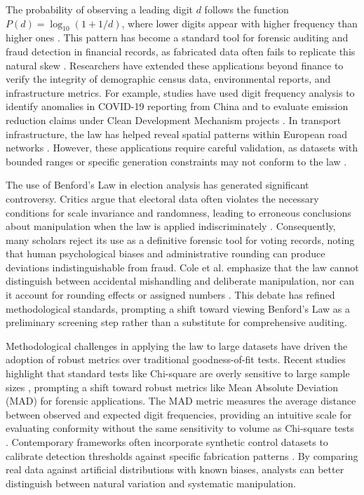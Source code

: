 \documentclass[11pt,a4paper]{article}
\begin{document}
The probability of observing a leading digit $d$ follows the function $P(d) = \log_{10}(1 + 1/d)$, where lower digits appear with higher frequency than higher ones \cite{Hill1998TheFD}. This pattern has become a standard tool for forensic auditing and fraud detection in financial records, as fabricated data often fails to replicate this natural skew \cite{Shalini2023DataQA,Azevedo2021ABL}. Researchers have extended these applications beyond finance to verify the integrity of demographic census data, environmental reports, and infrastructure metrics. For example, studies have used digit frequency analysis to identify anomalies in COVID-19 reporting from China and to evaluate emission reduction claims under Clean Development Mechanism projects \cite{Silva2024ANA,Cole2019TestingTE}. In transport infrastructure, the law has helped reveal spatial patterns within European road networks \cite{Ivanova2025BenfordsLA}. However, these applications require careful validation, as datasets with bounded ranges or specific generation constraints may not conform to the law \cite{Druica2018BenfordsLA}.

The use of Benford's Law in election analysis has generated significant controversy. Critics argue that electoral data often violates the necessary conditions for scale invariance and randomness, leading to erroneous conclusions about manipulation when the law is applied indiscriminately \cite{Kossovsky2021OnTM}. Consequently, many scholars reject its use as a definitive forensic tool for voting records, noting that human psychological biases and administrative rounding can produce deviations indistinguishable from fraud. Cole et al. emphasize that the law cannot distinguish between accidental mishandling and deliberate manipulation, nor can it account for rounding effects or assigned numbers \cite{Cole2019TestingTE}. This debate has refined methodological standards, prompting a shift toward viewing Benford's Law as a preliminary screening step rather than a substitute for comprehensive auditing.

Methodological challenges in applying the law to large datasets have driven the adoption of robust metrics over traditional goodness-of-fit tests. Recent studies highlight that standard tests like Chi-square are overly sensitive to large sample sizes \cite{Kossovsky2021OnTM}, prompting a shift toward robust metrics like Mean Absolute Deviation (MAD) for forensic applications. The MAD metric measures the average distance between observed and expected digit frequencies, providing an intuitive scale for evaluating conformity without the same sensitivity to volume as Chi-square tests \cite{Azevedo2021ABL,Cerqueti2021SomeNT}. Contemporary frameworks often incorporate synthetic control datasets to calibrate detection thresholds against specific fabrication patterns \cite{Petras2025DetectingBL}. By comparing real data against artificial distributions with known biases, analysts can better distinguish between natural variation and systematic manipulation.
\end{document}
